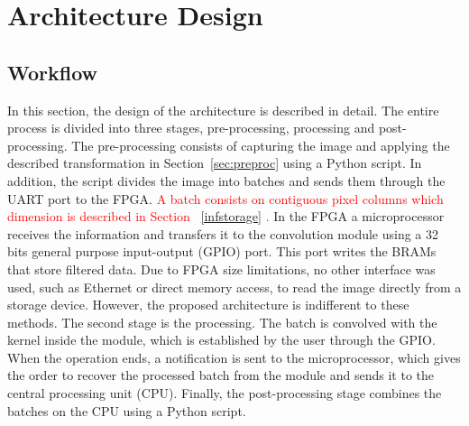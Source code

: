 \documentclass[conference,compsoc]{IEEEtran}
\begin{document}

\section{Architecture Design}\label{sec:architecture}

\subsection{Workflow}
In this section, the design of the architecture is described in detail. The
entire process is divided into three stages, pre-processing, processing and
post-processing. The pre-processing consists of capturing the image and applying
the described transformation in Section~\ref{sec:preproc} using a Python script.
In addition, the script divides the image into batches and sends them through
the UART port to the FPGA. \textcolor{red}{A batch consists on contiguous pixel columns which dimension is described in Section ~\ref{infstorage} . } In the FPGA a microprocessor receives the information
and transfers it to the convolution module using a 32 bits general purpose
input-output (GPIO) port. This port writes the BRAMs that store filtered data.
Due to FPGA size limitations, no other
interface was used, such as Ethernet or direct memory access, to read the
image directly from a storage device. However, the proposed architecture is
indifferent to these methods. The second stage is the processing. The batch is
convolved with the kernel inside the module, which is established by the user through
the GPIO. When the operation ends, a notification is sent to the microprocessor,
which gives the order to recover the processed batch from the module and sends it
to the central processing unit (CPU). Finally, the post-processing stage combines
the batches on the CPU using a Python script.

\end{document}
